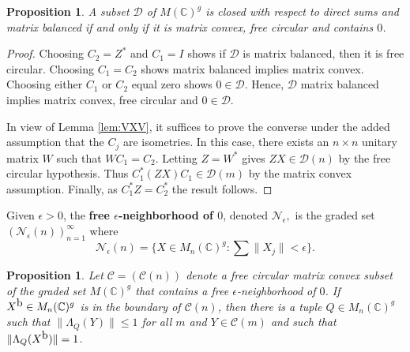 \documentclass[12pt,makeidx]{amsart}
\newtheorem{prop}[theorem]{Proposition}
\numberwithin{equation}{section}
\def\cD{ {{\mathcal D}}}
\def\cN{ {{\mathcal N}}}
\def\bbF{ {\mathbb C}}
\def\F{\mathbb{C}}
\def\cC{ {\mathcal C} }
\def\cD{ {\mathcal D} }
\def\cN{ {\mathcal N} }
\def\Cr{C_1}
\def\Cl{C_2}
\def\oX{X^{\mbox{\rm{b}}}}
\begin{document}
 

 \begin{prop}
 \label{prop:convexfreecircular}
   A subset  $\cD$ of $M(\F)^g$  is closed with respect to direct sums and  matrix balanced if and only if it is matrix convex,  free circular and contains $0$.
\end{prop}


\begin{proof}
 Choosing $\Cl=Z^*$  and $\Cr=I$  shows if $\cD$ is matrix balanced, then it is free circular.  Choosing $\Cr=\Cl$ shows matrix balanced implies matrix convex. Choosing either $\Cr$ or $\Cl$ equal zero shows $0\in\cD$.  Hence, $\cD$ matrix balanced implies matrix convex, free circular and $0\in \cD$. 

In view of Lemma \ref{lem:VXV}, it suffices to prove the converse under the added assumption that the $C_j$ are isometries. In this case, there exists an $n\times n$ unitary matrix $W$ such that $W\Cr=\Cl$.  Letting $Z=W^*$ gives $Z X \in \cD(n)$  by the free circular hypothesis. Thus $\Cr^* (ZX)\Cr\in \cD(m)$ by the matrix convex assumption. Finally, as $\Cr^* Z= \Cl^*$ the result follows.
\end{proof}



  Given $\epsilon>0$,
  the {\bf free $\epsilon$-neighborhood of $0$},
  denoted  $\cN_\epsilon,$ is the graded set 
  $(\cN_\epsilon(n))_{n=1}^\infty$ where
 \[
   \cN_\epsilon(n) =\{X\in M_n(\bbF)^g : \sum \| X_j \| < \epsilon  \}. 
 \]

\begin{prop}
 \label{prop:sharp}
 Let $\cC=(\cC(n))$ denote a  
free circular 
 matrix convex
 subset of the graded set  $M(\bbF)^g$ that 
 contains 
 a free $\epsilon$-neighborhood of $0$.
 If $\oX\in M_n(\bbF)^g$ is in the boundary of $\cC(n)$,
 then there is a tuple $Q\in M_n(\bbF)^g$ such that 
 $\|\Lambda_Q(Y)\|\le 1$ for all $m$ and
 $Y\in\cC(m)$  and such that  $\|\Lambda_Q(\oX)\|=1$. 
\end{prop}
\end{document}
